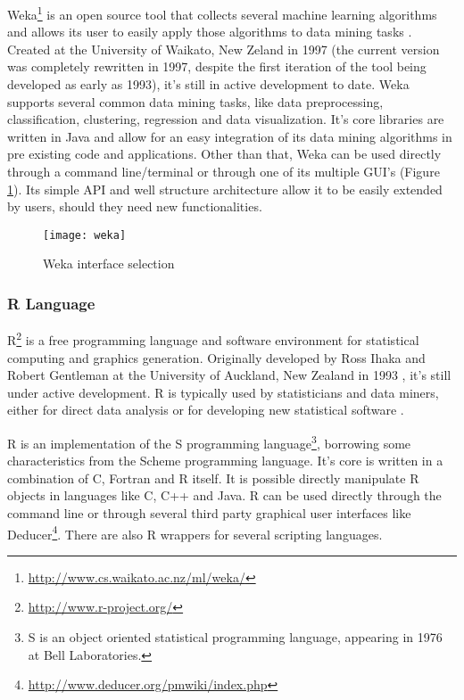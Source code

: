 Weka\footnote{\url{http://www.cs.waikato.ac.nz/ml/weka/}} is an open source tool that
collects several machine learning algorithms and allows its user to easily apply
those algorithms to data mining tasks \cite{Hall}. Created at the University of
Waikato, New Zeland in 1997 (the current version was completely rewritten in
1997, despite the first iteration of the tool being developed as early as 1993),
it's still in active development to date. Weka supports several common data
mining tasks, like data preprocessing, classification, clustering, regression
and data visualization. It's core libraries are written in Java and allow for an
easy integration of its data mining algorithms in pre existing code and
applications. Other than that, Weka can be used directly through a command
line/terminal or through one of its multiple GUI's (Figure \ref{fig:weka}). Its
simple API and well structure architecture allow it to be easily extended by
users, should they need new functionalities.

\begin{figure}[!htb]
  \begin{center}
    \leavevmode
    \texttt{[image: weka]}
    \caption{Weka interface selection}
    \label{fig:weka}
  \end{center}
\end{figure}

\subsubsection{R Language}

R\footnote{\url{http://www.r-project.org/}} is a free programming language and
software environment for statistical computing and graphics generation.
Originally developed by Ross Ihaka and Robert Gentleman at the University of
Auckland, New Zealand in 1993 \cite{Ihaka1998}, it's still under active
development. R is typically used by statisticians and data miners, either for
direct data analysis or for developing new statistical software \cite{Fox2005}.

R is an implementation of the S programming language\footnote{S is an object
oriented statistical programming language, appearing in 1976 at Bell
Laboratories.}, borrowing some characteristics from the Scheme programming
language. It's core is written in a combination of C, Fortran and R itself. It
is possible directly manipulate R objects in languages like C, C++ and Java. R
can be used directly through the command line or through several third party
graphical user interfaces like
Deducer\footnote{\url{http://www.deducer.org/pmwiki/index.php}}. There are also
R wrappers for several scripting languages.

